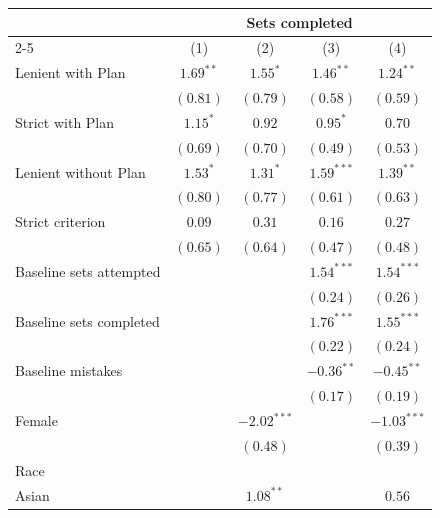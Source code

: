 \begin{tabular}{l c c c c}
\toprule
 & \multicolumn{4}{c}{Sets completed} \\
\cmidrule(lr){2-5}
 & (1) & (2) & (3) & (4) \\
\midrule
Lenient with Plan        & $1.69^{**}$   & $1.55^{*}$    & $1.46^{**}$  & $1.24^{**}$   \\
                         & $(0.81)$      & $(0.79)$      & $(0.58)$     & $(0.59)$      \\
Strict with Plan         & $1.15^{*}$    & $0.92$        & $0.95^{*}$   & $0.70$        \\
                         & $(0.69)$      & $(0.70)$      & $(0.49)$     & $(0.53)$      \\
Lenient without Plan     & $1.53^{*}$    & $1.31^{*}$    & $1.59^{***}$ & $1.39^{**}$   \\
                         & $(0.80)$      & $(0.77)$      & $(0.61)$     & $(0.63)$      \\
Strict criterion         & $0.09$        & $0.31$        & $0.16$       & $0.27$        \\
                         & $(0.65)$      & $(0.64)$      & $(0.47)$     & $(0.48)$      \\
Baseline sets attempted  &               &               & $1.54^{***}$ & $1.54^{***}$  \\
                         &               &               & $(0.24)$     & $(0.26)$      \\
Baseline sets completed  &               &               & $1.76^{***}$ & $1.55^{***}$  \\
                         &               &               & $(0.22)$     & $(0.24)$      \\
Baseline mistakes        &               &               & $-0.36^{**}$ & $-0.45^{**}$  \\
                         &               &               & $(0.17)$     & $(0.19)$      \\
Female                   &               & $-2.02^{***}$ &              & $-1.03^{***}$ \\
                         &               & $(0.48)$      &              & $(0.39)$      \\
Race                     &               &               &              &               \\
\quad Asian              &               & $1.08^{**}$   &              & $0.56$        \\

\end{tabular}
